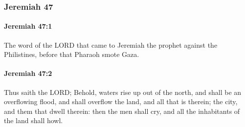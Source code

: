 	\subsubsection{Jeremiah 47} %
		\label{JEREMIAH-47}

		\paragraph{Jeremiah 47:1} %
			\label{JEREMIAH-47-1}

			The word of the LORD that came to Jeremiah the prophet against the Philistines, before that Pharaoh smote Gaza.


		\paragraph{Jeremiah 47:2} %
			\label{JEREMIAH-47-2}

			Thus saith the LORD; Behold, waters rise up out of the north, and shall be an overflowing flood, and shall overflow the land, and all that is therein; the city, and them that dwell therein: then the men shall cry, and all the inhabitants of the land shall howl.


